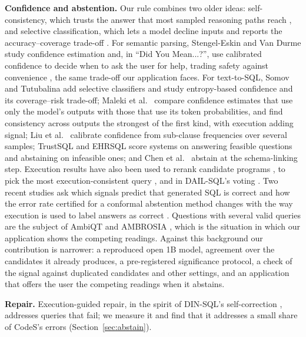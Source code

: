 \documentclass[conference]{IEEEtran}
\begin{document}
\textbf{Confidence and abstention.} Our rule combines two older ideas: self-consistency, which trusts the answer that most sampled reasoning paths reach \cite{wang2022selfconsistency}, and selective classification, which lets a model decline inputs and reports the accuracy--coverage trade-off \cite{geifman2017selective}. For semantic parsing, Stengel-Eskin and Van Durme study confidence estimation \cite{stengel2023calibrated} and, in ``Did You Mean...?'', use calibrated confidence to decide when to ask the user for help, trading safety against convenience \cite{stengel2023did}, the same trade-off our application faces. For text-to-SQL, Somov and Tutubalina \cite{somov2025confidence} add selective classifiers and study entropy-based confidence and its coverage--risk trade-off; Maleki et al.\ \cite{maleki2025confidence} compare confidence estimates that use only the model's outputs with those that use its token probabilities, and find consistency across outputs the strongest of the first kind, with execution adding signal; Liu et al.\ \cite{liu2025calibrating} calibrate confidence from sub-clause frequencies over several samples; TrustSQL \cite{lee2024trustsql} and EHRSQL \cite{lee2022ehrsql} score systems on answering feasible questions and abstaining on infeasible ones; and Chen et al.\ \cite{chen2025reliable} abstain at the schema-linking step. Execution results have also been used to rerank candidate programs \cite{ni2023lever}, to pick the most execution-consistent query \cite{borchmann2025query}, and in DAIL-SQL's voting \cite{gao2023texttosql}. Two recent studies ask which signals predict that generated SQL is correct \cite{richardson2026predicts} and how the error rate certified for a conformal abstention method changes with the way execution is used to label answers as correct \cite{liu2026certified}. Questions with several valid queries are the subject of AmbiQT \cite{bhaskar2023benchmarking} and AMBROSIA \cite{saparina2024ambrosia}, which is the situation in which our application shows the competing readings. Against this background our contribution is narrower: a reproduced open 1B model, agreement over the candidates it already produces, a pre-registered significance protocol, a check of the signal against duplicated candidates and other settings, and an application that offers the user the competing readings when it abstains.

\textbf{Repair.} Execution-guided repair, in the spirit of DIN-SQL's self-correction \cite{pourreza2023dinsql}, addresses queries that fail; we measure it and find that it addresses a small share of CodeS's errors (Section~\ref{sec:abstain}).
\end{document}
